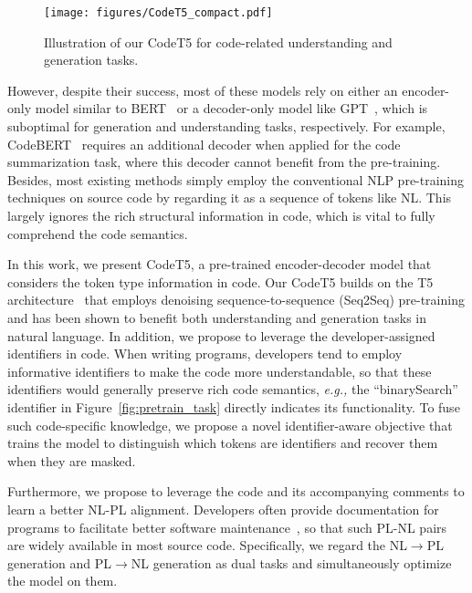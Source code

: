 \documentclass[11pt]{article}
\newcommand{\eg}{{\em e.g.,}\xspace}
\begin{document}
\begin{figure*}[t]
\centering
\texttt{[image: figures/CodeT5\_compact.pdf]}
\vspace{-0.5em}
\caption{Illustration of our CodeT5 for code-related understanding and generation  tasks.}\label{fig:finetune_task}
\vspace{-1em}
\end{figure*}



 
However, despite their success, most of these models rely on either an encoder-only model similar to BERT~\cite{DBLP:conf/sigsoft/SvyatkovskiyDFS20,DBLP:conf/emnlp/FengGTDFGS0LJZ20} or a decoder-only model like GPT~\cite{DBLP:conf/icml/KanadeMBS20}, which is suboptimal for generation and understanding tasks, respectively. For example, CodeBERT~\cite{DBLP:conf/emnlp/FengGTDFGS0LJZ20} requires an additional decoder when applied for the code summarization task, where this decoder cannot benefit from the pre-training. 
Besides, most existing methods simply employ the conventional NLP pre-training techniques on source code by regarding it as a sequence of tokens like NL. This largely ignores the rich structural information in code, which is vital to fully comprehend the  code semantics.


In this work, we present CodeT5, a pre-trained encoder-decoder model  that  considers the token type information in code.
Our CodeT5 builds on the T5 architecture~\cite{DBLP:journals/jmlr/RaffelSRLNMZLL20} that employs denoising sequence-to-sequence (Seq2Seq) pre-training and has been shown to benefit both understanding and generation tasks in natural language.
In addition, we propose to leverage the  developer-assigned identifiers in code.
When writing programs, developers tend to employ informative identifiers to make the code more understandable, so that these identifiers would generally preserve rich code semantics, \eg the ``binarySearch'' identifier in Figure~\ref{fig:pretrain_task} directly indicates its functionality. To fuse such code-specific knowledge, we propose a novel identifier-aware objective that trains the model to  distinguish which tokens are identifiers and recover them when they are masked.


Furthermore, we propose to leverage the code and its accompanying comments to learn a better NL-PL alignment. Developers often provide documentation for programs to facilitate better software maintenance~\cite{DBLP:conf/sigdoc/SouzaAO05}, so that such PL-NL pairs are widely available in most source code. Specifically, we regard the NL$\rightarrow$PL generation and   PL$\rightarrow$NL generation as dual tasks and simultaneously optimize the model on them. 
\end{document}
